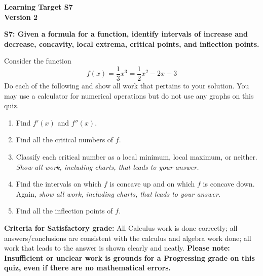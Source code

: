 \documentclass[10pt]{article}
\begin{document}
	\vspace*{0in}

		\begin{center}
			\textbf{Learning Target S7 \\
			Version 2} 
		\end{center}


\begin{framed}
	\textbf{S7: Given a formula for a function, identify intervals of increase and decrease, concavity, local extrema, critical points, and inflection points.}
\end{framed}

Consider the function 
$$f(x) = \frac{1}{3}x^3 = \frac{1}{2}x^2 - 2x + 3$$
Do each of the following and show all work that pertains to your solution. You may use a calculator for numerical operations but do not use any graphs on this quiz. 
\begin{enumerate}
    \item Find $f'(x)$ and $f''(x)$. 
    \item Find all the critical numbers of $f$.
    \item Classify each critical number as a local minimum, local maximum, or neither. \emph{Show all work, including charts, that leads to your answer.} 
    \item Find the intervals on which $f$ is concave up and on which $f$ is concave down. Again, \emph{show all work, including charts, that leads to your answer.} 
    \item Find all the inflection points of $f$. 
\end{enumerate}

\vfill


\begin{small}
    \begin{framed}
        	\textbf{Criteria for Satisfactory grade:} All Calculus work is done correctly; all answers/conclusions are consistent with the calculus and algebra work done; all work that leads to the answer is shown clearly and neatly. \textbf{Please note: Insufficient or unclear work is grounds for a Progressing grade on this quiz, even if there are no mathematical errors.}
    \end{framed}

\end{small}
\end{document}
